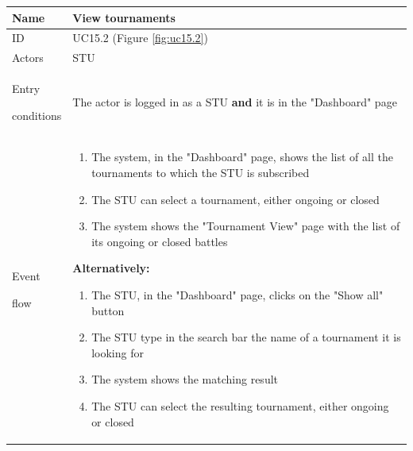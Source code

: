 \begin{center}
    \def\arraystretch{1.5}
    \begin{tabular}{| m{2cm} | m{10cm}|}
        \hline
        Name                  & View tournaments                                                                                                                                                                \\ \hline
        ID                    & UC15.2 (Figure \ref{fig:uc15.2})                                                                                                                                                  \\ \hline
        Actors                & STU                                                                                                                                                                             \\ \hline
        Entry \par conditions & The actor is logged in as a STU \textbf{and} it is in the "Dashboard" page                                                                                                      \\ \hline
        Event \par flow       & \begin{enumerate}
                                    \item The system, in the "Dashboard" page, shows the list of all the tournaments to which the STU is subscribed
                                    \item The STU can select a tournament, either ongoing or closed
                                    \item The system shows the "Tournament View" page with the list of its ongoing or closed battles
                                \end{enumerate}
                                \textbf{Alternatively:}
                                \begin{enumerate}
                                    \item The STU, in the "Dashboard" page, clicks on the "Show all" button
                                    \item The STU type in the search bar the name of a tournament it is looking for
                                    \item The system shows the matching result 
                                    \item The STU can select the resulting tournament, either ongoing or closed

\end{enumerate}
\end{tabular}
\end{center}
